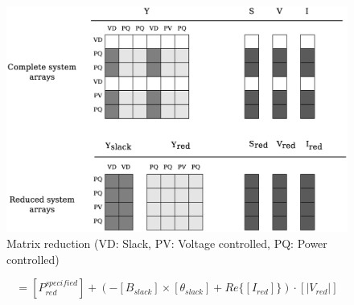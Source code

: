 \documentclass[nols,a4paper,twoside,symmetric,notoc,fleqn]{tufte-book}
\begin{document}
\begin{figure}[h!]
	\centering
	\includegraphics[width=0.85\linewidth]{img/Matrix_reduction.eps}
	\caption{Matrix reduction (VD: Slack, PV: Voltage controlled, PQ: Power controlled)}
	\label{fig:Matrix_reduction}
\end{figure}

%
%
%
%
%
%
%
%
%

\begin{equation}
[P_{red}] = \left[P^{specified}_{red}\right] + \left(- [{B}_{slack}] \times [{\theta}_{slack}] + Re \{ [I_{red}] \}  \right) \cdot [|{V}_{red}|]
\label{dc_power_injections}
\end{equation}

\end{document}
